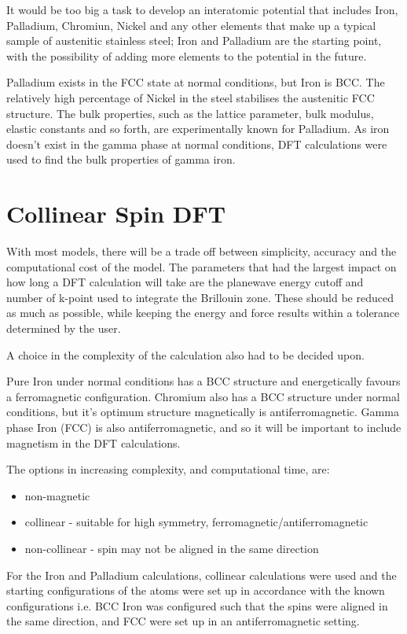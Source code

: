 It would be too big a task to develop an interatomic potential that includes Iron, Palladium, Chromiun, Nickel and any other elements that make up a typical sample of austenitic stainless steel; Iron and Palladium are the starting point, with the possibility of adding more elements to the potential in the future.

Palladium exists in the FCC state at normal conditions, but Iron is BCC.  The relatively high percentage of Nickel in the steel stabilises the austenitic FCC structure.  The bulk properties, such as the lattice parameter, bulk modulus, elastic constants and so forth, are experimentally known for Palladium.  As iron doesn't exist in the gamma phase at normal conditions, DFT calculations were used to find the bulk properties of gamma iron.

\section{Collinear Spin DFT}

With most models, there will be a trade off between simplicity, accuracy and the computational cost of the model.  The parameters that had the largest impact on how long a DFT calculation will take are the planewave energy cutoff and number of k-point used to integrate the Brillouin zone.  These should be reduced as much as possible, while keeping the energy and force results within a tolerance determined by the user.

A choice in the complexity of the calculation also had to be decided upon.

Pure Iron under normal conditions has a BCC structure and energetically favours a ferromagnetic configuration.  Chromium also has a BCC structure under normal conditions, but it's optimum structure magnetically is antiferromagnetic.  Gamma phase Iron (FCC) is also antiferromagnetic, and so it will be important to include magnetism in the DFT calculations.

The options in increasing complexity, and computational time, are:

\begin{itemize}
\item non-magnetic
\item collinear - suitable for high symmetry, ferromagnetic/antiferromagnetic
\item non-collinear - spin may not be aligned in the same direction
\end{itemize}

For the Iron and Palladium calculations, collinear calculations were used and the starting configurations of the atoms were set up in accordance with the known configurations i.e. BCC Iron was configured such that the spins were aligned in the same direction, and FCC were set up in an antiferromagnetic setting.

